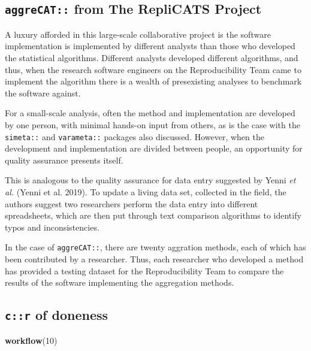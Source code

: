 \documentclass[
]{article}
\newenvironment{Shaded}{\begin{snugshade}}{\end{snugshade}}
\newcommand{\DecValTok}[1]{\textcolor[rgb]{0.00,0.00,0.81}{#1}}
\newcommand{\KeywordTok}[1]{\textcolor[rgb]{0.13,0.29,0.53}{\textbf{#1}}}
\newcommand{\NormalTok}[1]{#1}
\begin{document}
\hypertarget{aggrecat-from-the-replicats-project}{%
\subsection{\texorpdfstring{\texttt{aggreCAT::} from The RepliCATS
Project}{aggreCAT:: from The RepliCATS Project}}\label{aggrecat-from-the-replicats-project}}

A luxury afforded in this large-scale collaborative project is the
software implementation is implemented by different analysts than those
who developed the statistical algorithms. Different analysts developed
different algorithms, and thus, when the research software engineers on
the Reproducibility Team came to implement the algorithm there is a
wealth of presexisting analyses to benchmark the software against.

For a small-scale analysis, often the method and implementation are
developed by one person, with minimal hands-on input from others, as is
the case with the \texttt{simeta::} and \texttt{varameta::} packages
also discussed. However, when the development and implementation are
divided between people, an opportunity for quality assurance presents
itself.

This is analogous to the quality assurance for data entry suggested by
Yenni \emph{et al.} (Yenni et al. 2019). To update a living data set,
collected in the field, the authors suggest two researchers perform the
data entry into different spreadsheets, which are then put through text
comparison algorithms to identify typos and inconsistencies.

In the case of \texttt{aggreCAT::}, there are twenty aggration methods,
each of which has been contributed by a researcher. Thus, each
researcher who developed a method has provided a testing dataset for the
Reproducibility Team to compare the results of the software implementing
the aggregation methods.

\hypertarget{cr-of-doneness}{%
\subsection{\texorpdfstring{\texttt{c::r} of
doneness}{c::r of doneness}}\label{cr-of-doneness}}

\begin{Shaded}
\begin{Highlighting}[]
\KeywordTok{workflow}\NormalTok{(}\DecValTok{10}\NormalTok{)}
\end{Highlighting}
\end{Shaded}
\end{document}
